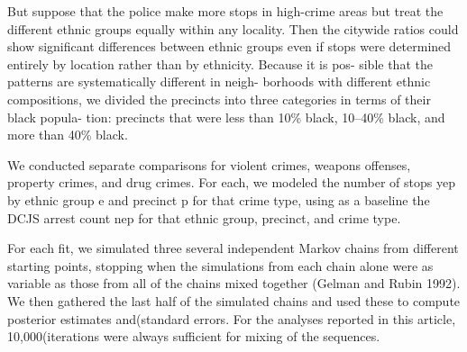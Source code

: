 \documentclass[]{article}
\begin{document}
But suppose that the police make more stops in high-crime areas but
treat the different ethnic groups equally within any locality. Then the
citywide ratios could show significant differences between ethnic groups
even if stops were determined entirely by location rather than by
ethnicity. Because it is pos- sible that the patterns are systematically
different in neigh- borhoods with different ethnic compositions, we
divided the precincts into three categories in terms of their black
popula- tion: precincts that were less than 10\% black, 10--40\% black,
and more than 40\% black.

We conducted separate comparisons for violent crimes, weapons offenses,
property crimes, and drug crimes. For each, we modeled the number of
stops yep by ethnic group e and precinct p for that crime type, using as
a baseline the DCJS arrest count nep for that ethnic group, precinct,
and crime type.

For each fit, we simulated three several independent Markov chains from
different starting points, stopping when the simulations from each chain
alone were as variable as those from all of the chains mixed together
(Gelman and Rubin 1992). We then gathered the last half of the simulated
chains and used these to compute posterior estimates and(standard
errors. For the analyses reported in this article, 10,000(iterations
were always sufficient for mixing of the sequences.
\end{document}
